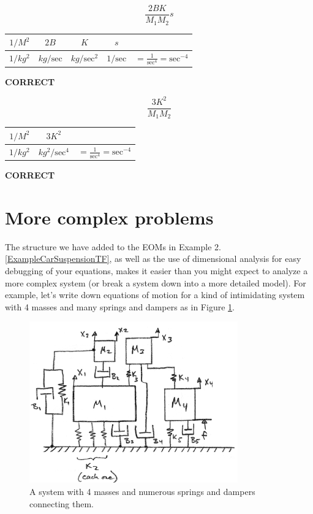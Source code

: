 \begin{Example}
\[
\frac{2BK}{M_1M_2}s
\]


\begin{tabular}{c|c|c|c|c}
$1/M^2$	  & $2B$		& $K$	& $s$ & \\ \hline
$1/kg^2$  & $kg/\mathrm{sec}$	& $kg/\mathrm{sec}^2$	& $1/\mathrm{sec}$	& $= \frac{1}{\mathrm{sec}^4} = \mathrm{sec}^{-4}$
\end{tabular}
\hspace{0.25in}  {\bf CORRECT}



\[
\frac{3K^2}{M_1M_2}
\]

\begin{tabular}{c|c|c}
$1/M^2$	& $3K^2$   & \\ \hline
$1/kg^2$  & $kg^2/\mathrm{sec}^4$	& $= \frac{1}{\mathrm{sec}^4} = \mathrm{sec}^{-4}$
\end{tabular}\hspace{0.25in}  {\bf CORRECT}

\end{Example}

\section{More complex problems}
The structure we have added to the EOMs in Example 2.\ref{ExampleCarSuspensionTF}, as well as the
use of dimensional analysis for easy debugging of your equations, makes it easier than you
might expect to analyze a more complex system (or break a system down into a more detailed model).
For example, let's write down equations of motion for a kind of intimidating
system with 4 masses and many springs and
dampers as in Figure \ref{complexDynSystem}.


\begin{figure}\centering
\includegraphics[width=90mm]{figs02/00933a.png}
\caption{A system with 4 masses and numerous springs and dampers connecting them.}
\label{complexDynSystem}
\end{figure}

